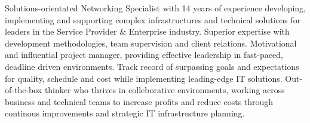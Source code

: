 

\begin{cvparagraph}

	Solutions-orientated Networking Specialist with 14 years of experience developing, implementing and supporting complex infrastructures and technical
	solutions for leaders in the Service Provider \& Enterprise industry. Superior expertise with development methodologies, team 
	supervision and client relations. Motivational and influential project manager, providing effective leadership in fast-paced, 
	deadline driven environments. Track record of surpassing goals and expectations for quality, schedule and cost while implementing 
	leading-edge IT solutions. Out-of-the-box thinker who thrives in colleborative environments, working across business and technical 
	teams to increase profits and reduce costs through continous improvements and strategic IT infrastructure planning.
\end{cvparagraph}
